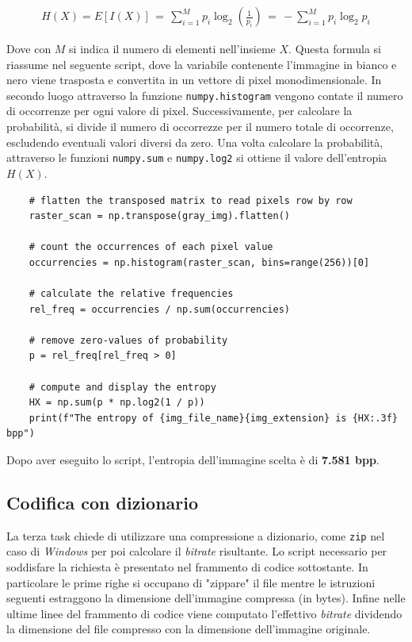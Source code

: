 \begin{gather*}
    H(X) = E[I(X)] \, = \, \sum_{i = 1}^M p_i\log_2\left( \frac{1}{p_i} \right) \, = \, - \sum_{i = 1}^M p_i\log_2{p_i}
\end{gather*}

\noindent Dove con $M$ si indica il numero di elementi nell'insieme $X$. Questa formula si riassume nel seguente script, dove la variabile contenente l'immagine in bianco e nero viene trasposta e convertita in un vettore di pixel monodimensionale. In secondo luogo attraverso la funzione \texttt{numpy.histogram} vengono contate il numero di occorrenze per ogni valore di pixel. Successivamente, per calcolare la probabilità, si divide il numero di occorrezze per il numero totale di occorrenze, escludendo eventuali valori diversi da zero. Una volta calcolare la probabilità, attraverso le funzioni  \texttt{numpy.sum} e \texttt{numpy.log2} si ottiene il valore dell'entropia $H(X)$.


\begin{lstlisting}
    # flatten the transposed matrix to read pixels row by row
    raster_scan = np.transpose(gray_img).flatten()

    # count the occurrences of each pixel value
    occurrencies = np.histogram(raster_scan, bins=range(256))[0]

    # calculate the relative frequencies
    rel_freq = occurrencies / np.sum(occurrencies)

    # remove zero-values of probability
    p = rel_freq[rel_freq > 0]

    # compute and display the entropy
    HX = np.sum(p * np.log2(1 / p))
    print(f"The entropy of {img_file_name}{img_extension} is {HX:.3f} bpp")
\end{lstlisting}

\noindent Dopo aver eseguito lo script, l'entropia dell'immagine scelta è di \textbf{7.581 bpp}.



\vspace{15px}\subsection{Codifica con dizionario}
La terza task chiede di utilizzare una compressione a dizionario, come \texttt{zip} nel caso di \textsl{Windows} per poi calcolare il \textsl{bitrate} risultante. Lo script necessario per soddisfare la richiesta è presentato nel frammento di codice sottostante. In particolare le prime righe si occupano di "zippare" il file mentre le istruzioni seguenti estraggono la dimensione dell'immagine compressa (in bytes). Infine nelle ultime linee del frammento di codice viene computato l'effettivo \textsl{bitrate} dividendo la dimensione del file compresso con la dimensione dell'immagine originale.

